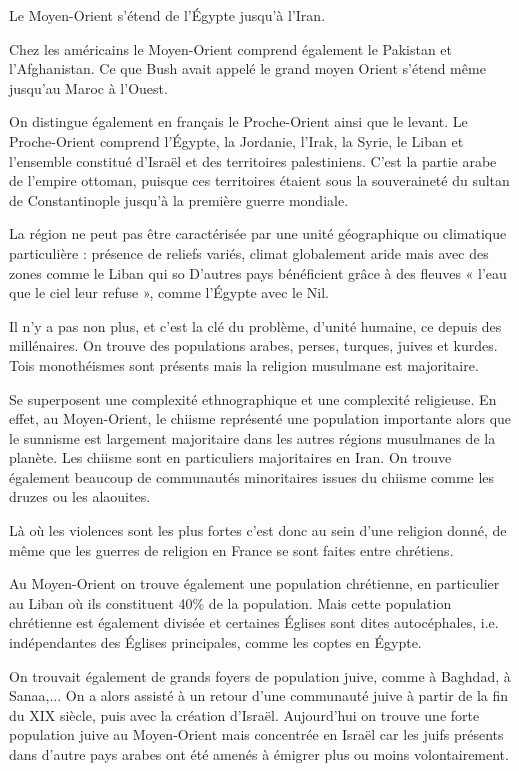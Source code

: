 \documentclass[a4paper,10pt]{article}
\begin{document}
		Le Moyen-Orient s'étend de l'Égypte jusqu'à l'Iran.

		Chez les américains le Moyen-Orient comprend également le Pakistan et l'Afghanistan.
		Ce que Bush avait appelé le grand moyen Orient s'étend même jusqu'au Maroc à l'Ouest.

		On distingue également en français le Proche-Orient ainsi que le levant.
		Le Proche-Orient comprend l'Égypte, la Jordanie, l'Irak, la Syrie, le Liban et l'ensemble constitué d'Israël et des territoires palestiniens.
		C'est la partie arabe de l'empire ottoman, puisque ces territoires étaient sous la souveraineté du sultan de Constantinople jusqu'à la première guerre mondiale.

		La région ne peut pas être caractérisée par une unité géographique ou climatique particulière : présence de reliefs variés, climat globalement aride mais avec des zones comme le Liban qui so
		D'autres pays bénéficient grâce à des fleuves « l'eau que le ciel leur refuse », comme l'Égypte avec le Nil.

		Il n'y a pas non plus, et c'est la clé du problème, d'unité humaine, ce depuis des millénaires.
		On trouve des populations arabes, perses, turques, juives et kurdes.
		Tois monothéismes sont présents mais la religion musulmane est majoritaire.

		Se superposent une complexité ethnographique et une complexité religieuse.
		En effet, au Moyen-Orient, le chiisme représenté une population importante alors que le sunnisme est largement majoritaire dans les autres régions musulmanes de la planète.
		Les chiisme sont en particuliers majoritaires en Iran.
		On trouve également beaucoup de communautés minoritaires issues du chiisme comme les druzes ou les alaouites.

		Là où les violences sont les plus fortes c'est donc au sein d'une religion donné, de même que les guerres de religion en France se sont faites entre chrétiens.

		Au Moyen-Orient on trouve également une population chrétienne, en particulier au Liban où ils constituent 40\% de la population.
		Mais cette population chrétienne est également divisée et certaines Églises sont dites autocéphales, i.e. indépendantes des Églises principales, comme les coptes en Égypte.

		On trouvait également de grands foyers de population juive, comme à Baghdad, à Sanaa,...
		On a alors assisté à un retour d'une communauté juive à partir de la fin du XIX siècle, puis avec la création d'Israël.
		Aujourd'hui on trouve une forte population juive au Moyen-Orient mais concentrée en Israël car les juifs présents dans d'autre pays arabes ont été amenés à émigrer plus ou moins volontairement.
\end{document}
